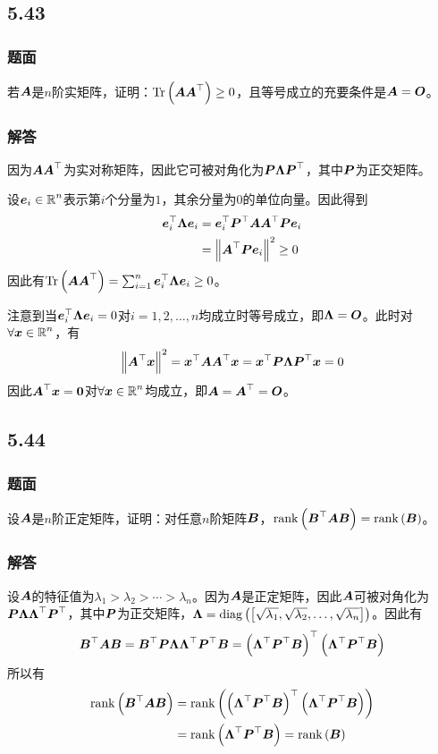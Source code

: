 \documentclass{beamer}
\begin{document}
\subsection*{5.43}
\begin{frame}
    \frametitle{题面}
    若\(\mata\)是\(n\)阶实矩阵，证明：\(\trace{\mata\mata^\top}\ge0\)，且等号成立的充要条件是\(\mata=\mato\)。
\end{frame}

\begin{frame}
    \frametitle{解答}
    因为\(\mata\mata^\top\)为实对称矩阵，因此它可被对角化为\(\matp\matlam\matp^\top\)，其中\(\matp\)为正交矩阵。

    设\(\vece_i\in\rea^n\)表示第\(i\)个分量为\(1\)，其余分量为\(0\)的单位向量。因此得到
    \begin{align*}
        \vece_i^\top\matlam\vece_i & =\vece_i^\top\matp^\top\mata\mata^\top\matp\vece_i \\
                                   & =\Abs{\mata^\top\matp\vece_i}^2\ge0
    \end{align*}
    因此有\(\trace{\mata\mata^\top}=\sum_{i=1}^n\vece_i^\top\matlam\vece_i\ge0\)。
    \pause

    注意到当\(\vece_i^\top\matlam\vece_i=0\)对\(i=1,2,\dots,n\)均成立时等号成立，即\(\matlam=\mato\)。此时对\(\forall\vecx\in\rea^n\)，有
    \begin{equation*}
        \Abs{\mata^\top\vecx}^2=\vecx^\top\mata\mata^\top\vecx=\vecx^\top\matp\matlam\matp^\top\vecx=0
    \end{equation*}
    因此\(\mata^\top\vecx=\veczero\)对\(\forall\vecx\in\rea^n\)均成立，即\(\mata=\mata^\top=\mato\)。
\end{frame}

\subsection*{5.44}
\begin{frame}
    \frametitle{题面}
    设\(\mata\)是\(n\)阶正定矩阵，证明：对任意\(n\)阶矩阵\(\matb\)，\(\rank{\matb^\top\mata\matb}=\rank{\matb}\)。
\end{frame}

\begin{frame}
    \frametitle{解答}
    设\(\mata\)的特征值为\(\lambda_1>\lambda_2>\cdots>\lambda_n\)。因为\(\mata\)是正定矩阵，因此\(\mata\)可被对角化为\(\matp\matlam\matlam^\top\matp^\top\)，其中\(\matp\)为正交矩阵，\(\matlam=\diag{\mat{\sqrt{\lambda_1},\sqrt{\lambda_2},\dots,\sqrt{\lambda_n}}}\)。因此有
    \begin{equation*}
        \matb^\top\mata\matb=\matb^\top\matp\matlam\matlam^\top\matp^\top\matb=\spar{\matlam^\top\matp^\top\matb}^\top\spar{\matlam^\top\matp^\top\matb}
    \end{equation*}
    \pause
    所以有
    \begin{align*}
        \rank{\matb^\top\mata\matb} & =\rank{\spar{\matlam^\top\matp^\top\matb}^\top\spar{\matlam^\top\matp^\top\matb}} \\
                                    & =\rank{\matlam^\top\matp^\top\matb}=\rank{\matb}
    \end{align*}
\end{frame}
\end{document}
